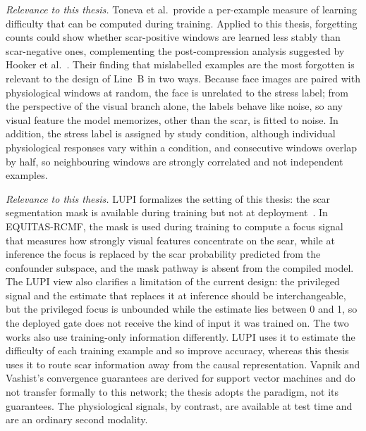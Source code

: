 \textit{Relevance to this thesis.} Toneva et al.\ provide a per-example measure of learning difficulty that can be computed during training. Applied to this thesis, forgetting counts could show whether scar-positive windows are learned less stably than scar-negative ones, complementing the post-compression analysis suggested by Hooker et al.~\cite{hooker2019}. Their finding that mislabelled examples are the most forgotten is relevant to the design of Line~B in two ways. Because face images are paired with physiological windows at random, the face is unrelated to the stress label; from the perspective of the visual branch alone, the labels behave like noise, so any visual feature the model memorizes, other than the scar, is fitted to noise. In addition, the stress label is assigned by study condition, although individual physiological responses vary within a condition, and consecutive windows overlap by half, so neighbouring windows are strongly correlated and not independent examples.


\textit{Relevance to this thesis.} LUPI formalizes the setting of this thesis: the scar segmentation mask is available during training but not at deployment~\cite{vapnik2009, vapnik2015}. In EQUITAS-RCMF, the mask is used during training to compute a focus signal that measures how strongly visual features concentrate on the scar, while at inference the focus is replaced by the scar probability predicted from the confounder subspace, and the mask pathway is absent from the compiled model. The LUPI view also clarifies a limitation of the current design: the privileged signal and the estimate that replaces it at inference should be interchangeable, but the privileged focus is unbounded while the estimate lies between 0 and 1, so the deployed gate does not receive the kind of input it was trained on. The two works also use training-only information differently. LUPI uses it to estimate the difficulty of each training example and so improve accuracy, whereas this thesis uses it to route scar information away from the causal representation. Vapnik and Vashist's convergence guarantees are derived for support vector machines and do not transfer formally to this network; the thesis adopts the paradigm, not its guarantees. The physiological signals, by contrast, are available at test time and are an ordinary second modality.


